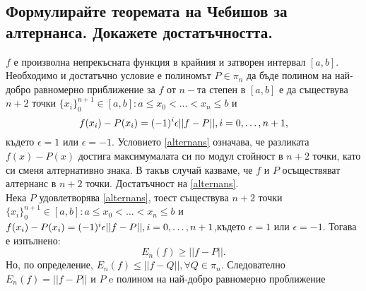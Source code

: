 \documentclass[12pt]{article}
\numberwithin{equation}{subsection}
\numberwithin{theorem}{subsection}
\numberwithin{definition}{subsection}
\numberwithin{corollary}{subsection}
\begin{document}
\subsection{Формулирайте теоремата на Чебишов за алтернанса. Докажете достатъчността.}
   $f $ е произволна непрекъсната функция в крайния и затворен интервал $[a,b]$. Необходимо и достатъчно условие е полиномът $P\in\pi_n$ да бъде полином на най-добро равномерно приближение за $f $ от $n-$та степен в $[a,b]$ е да съществува $n+2$ точки $\{x_i\}_0^{n+1}\in[a,b]:a\leq x_0<\ldots<x_n\leq b$ и
  \begin{equation}\label{alternans}
    f(x_i)-P(x_i)=(-1)^i\epsilon||f-P||,\hfill i=0,\ldots,n+1,
  \end{equation}
  където $\epsilon=1$ или $\epsilon=-1$.
  \proof
  Условието \ref{alternans} означава, че разликата $f(x)-P(x)$ достига максимумалата си по модул стойност в $n+2$ точки, като си сменя алтернативно знака. В такъв случай казваме, че $f$ и $P$ осъществяват алтернанс в $n+2$ точки.
  Достатъчност на \ref{alternans}.\\
  Нека $P$ удовлетворява \ref{alternans}, тоест съществува $n+2$ точки $\{x_i\}_0^{n+1}\in[a,b]:a\leq x_0<\ldots<x_n\leq b$ и $f(x_i)-P(x_i)=(-1)^i\epsilon||f-P||,\hfill i=0,\ldots,n+1$,където $\epsilon=1$ или $\epsilon=-1$. Тогава е изпълнено:
  \begin{equation*}
    E_n(f)\geq ||f-P||.
  \end{equation*}
  Но, по определение, $E_n(f)\leq||f-Q||,\forall Q\in\pi_n$. Следователно $E_n(f)=||f-P||$ и $P$ e полином на най-добро равномерно проближение 
\end{document}

